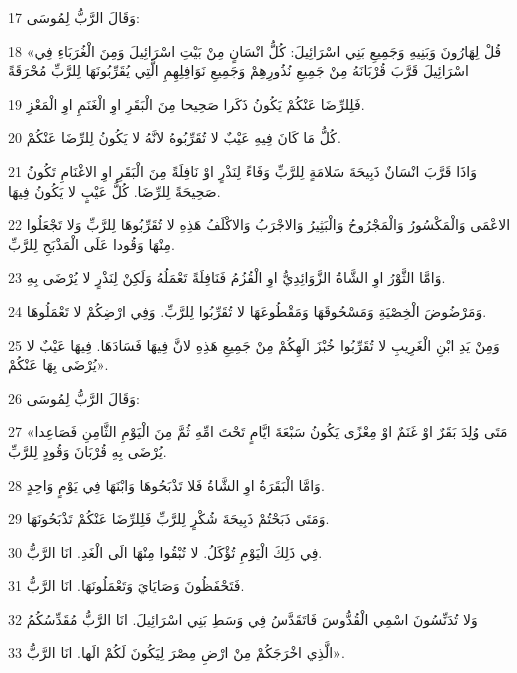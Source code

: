 \par 17 وَقَالَ الرَّبُّ لِمُوسَى:
\par 18 «قُلْ لِهَارُونَ وَبَنِيهِ وَجَمِيعِ بَنِي اسْرَائِيلَ: كُلُّ انْسَانٍ مِنْ بَيْتِ اسْرَائِيلَ وَمِنَ الْغُرَبَاءِ فِي اسْرَائِيلَ قَرَّبَ قُرْبَانَهُ مِنْ جَمِيعِ نُذُورِهِمْ وَجَمِيعِ نَوَافِلِهِمِ الَّتِي يُقَرِّبُونَهَا لِلرَّبِّ مُحْرَقَةً
\par 19 فَلِلرِّضَا عَنْكُمْ يَكُونُ ذَكَرا صَحِيحا مِنَ الْبَقَرِ اوِ الْغَنَمِ اوِ الْمَعْزِ.
\par 20 كُلُّ مَا كَانَ فِيهِ عَيْبٌ لا تُقَرِّبُوهُ لانَّهُ لا يَكُونُ لِلرِّضَا عَنْكُمْ.
\par 21 وَاذَا قَرَّبَ انْسَانٌ ذَبِيحَةَ سَلامَةٍ لِلرَّبِّ وَفَاءً لِنَذْرٍ اوْ نَافِلَةً مِنَ الْبَقَرِ اوِ الاغْنَامِ تَكُونُ صَحِيحَةً لِلرِّضَا. كُلُّ عَيْبٍ لا يَكُونُ فِيهَا.
\par 22 الاعْمَى وَالْمَكْسُورُ وَالْمَجْرُوحُ وَالْبَثِيرُ وَالاجْرَبُ وَالاكْلَفُ هَذِهِ لا تُقَرِّبُوهَا لِلرَّبِّ وَلا تَجْعَلُوا مِنْهَا وَقُودا عَلَى الْمَذْبَحِ لِلرَّبِّ.
\par 23 وَامَّا الثَّوْرُ اوِ الشَّاةُ الزَّوَائِدِيُّ اوِ الْقُزُمُ فَنَافِلَةً تَعْمَلُهُ وَلَكِنْ لِنَذْرٍ لا يُرْضَى بِهِ.
\par 24 وَمَرْضُوضَ الْخِصْيَةِ وَمَسْحُوقَهَا وَمَقْطُوعَهَا لا تُقَرِّبُوا لِلرَّبِّ. وَفِي ارْضِكُمْ لا تَعْمَلُوهَا.
\par 25 وَمِنْ يَدِ ابْنِ الْغَرِيبِ لا تُقَرِّبُوا خُبْزَ الَهِكُمْ مِنْ جَمِيعِ هَذِهِ لانَّ فِيهَا فَسَادَهَا. فِيهَا عَيْبٌ لا يُرْضَى بِهَا عَنْكُمْ».
\par 26 وَقَالَ الرَّبُّ لِمُوسَى:
\par 27 «مَتَى وُلِدَ بَقَرٌ اوْ غَنَمٌ اوْ مِعْزًى يَكُونُ سَبْعَةَ ايَّامٍ تَحْتَ امِّهِ ثُمَّ مِنَ الْيَوْمِ الثَّامِنِ فَصَاعِدا يُرْضَى بِهِ قُرْبَانَ وَقُودٍ لِلرَّبِّ.
\par 28 وَامَّا الْبَقَرَةُ اوِ الشَّاةُ فَلا تَذْبَحُوهَا وَابْنَهَا فِي يَوْمٍ وَاحِدٍ.
\par 29 وَمَتَى ذَبَحْتُمْ ذَبِيحَةَ شُكْرٍ لِلرَّبِّ فَلِلرِّضَا عَنْكُمْ تَذْبَحُونَهَا.
\par 30 فِي ذَلِكَ الْيَوْمِ تُؤْكَلُ. لا تُبْقُوا مِنْهَا الَى الْغَدِ. انَا الرَّبُّ.
\par 31 فَتَحْفَظُونَ وَصَايَايَ وَتَعْمَلُونَهَا. انَا الرَّبُّ.
\par 32 وَلا تُدَنِّسُونَ اسْمِي الْقُدُّوسَ فَاتَقَدَّسُ فِي وَسَطِ بَنِي اسْرَائِيلَ. انَا الرَّبُّ مُقَدِّسُكُمُ
\par 33 الَّذِي اخْرَجَكُمْ مِنْ ارْضِ مِصْرَ لِيَكُونَ لَكُمْ الَها. انَا الرَّبُّ».

